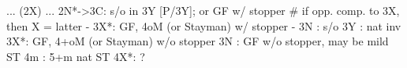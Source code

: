 ... (2X) ...
2N*->3C: s/o in 3Y [P/3Y]; or GF w/ stopper  # if opp. comp. to 3X, then X = latter
	   - 3X*: GF, 4oM (or Stayman) w/ stopper
	   - 3N : s/o
3Y : nat inv
3X*: GF, 4+oM (or Stayman) w/o stopper
3N : GF w/o stopper, may be mild ST
4m : 5+m nat ST
4X*: ?
